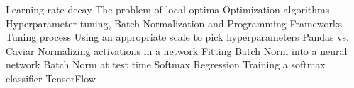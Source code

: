 \documentclass[11pt,a4paper]{moderncv}
\begin{document}
{            Learning rate decay                                                          %
            The problem of local optima                                                          %
            Optimization algorithms                                                          %
            Hyperparameter tuning, Batch Normalization and Programming Frameworks                                                          %
            Tuning process                                                          %
            Using an appropriate scale to pick hyperparameters                                                          %
            Pandas vs. Caviar                                                          %
            Normalizing activations in a network                                                          %
            Fitting Batch Norm into a neural network                                                          %
            Batch Norm at test time                                                          %
            Softmax Regression                                                          %
            Training a softmax classifier                                                          %
            TensorFlow                                                          %
    }
\end{document}
